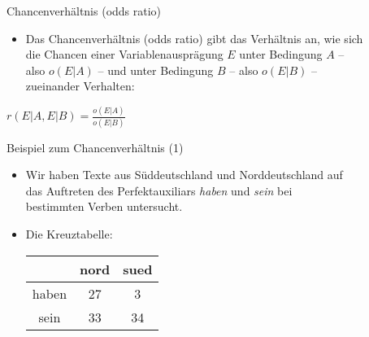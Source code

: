 \begin{frame}
  {Chancenverhältnis (odds ratio)}
  \begin{itemize}
    \item Das \alert{Chancenverhältnis (odds ratio)} gibt das Verhältnis an, wie sich\\
      die Chancen einer Variablenausprägung $E$ unter Bedingung $A$ --\\
      also $o(E|A)$ -- und unter Bedingung $B$ -- also $o(E|B)$ -- \\
      zueinander Verhalten:
  \end{itemize}
  \begin{center}
    \alert{$r(E|A, E|B)=\frac{o(E|A)}{o(E|B)}$}
  \end{center}
\end{frame}

\begin{frame}
  {Beispiel zum Chancenverhältnis (1)}
  \begin{itemize}
    \item Wir haben Texte aus Süddeutschland und Norddeutschland auf\\
      das Auftreten des Perfektauxiliars \textit{haben} und \textit{sein} bei\\
      bestimmten Verben untersucht.
    \item Die Kreuztabelle:
      \begin{center}
	\begin{tabular}{|c|c|c|}
	      \hline
	      &  nord & sued \\
	      \hline
	      haben   &  27      & 3   \\
	      \hline
	      sein   &  33      & 34  \\
	      \hline
	\end{tabular}
      \end{center}
  \end{itemize}
\end{frame}

